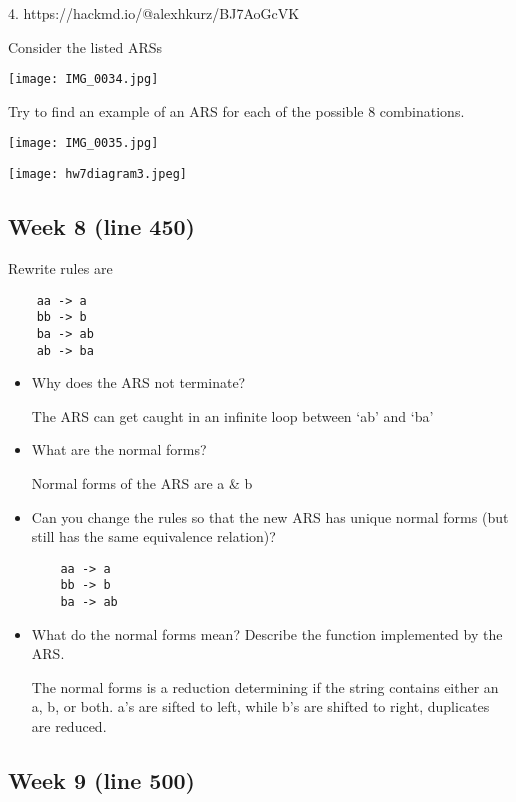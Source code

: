 \documentclass{article}
\theoremstyle{theorem}
\theoremstyle{definition}
\theoremstyle{remark}
\begin{document}
4.  https://hackmd.io/@alexhkurz/BJ7AoGcVK

Consider the listed ARSs

\texttt{[image: IMG\_0034.jpg]}

Try to find an example of an ARS for each of the possible 8 combinations.

\texttt{[image: IMG\_0035.jpg]}

\texttt{[image: hw7diagram3.jpeg]}

\subsection{Week 8 (line 450)}
Rewrite rules are
\begin{verbatim}
    aa -> a
    bb -> b
    ba -> ab
    ab -> ba
\end{verbatim}
\begin{itemize}
\item Why does the ARS not terminate?

The ARS can get caught in an infinite loop between ‘ab’ and ‘ba’

\item What are the normal forms?

Normal forms of the ARS are a & b

\item Can you change the rules so that the new ARS has unique normal forms (but still has the same equivalence relation)?
\begin{verbatim}
    aa -> a
    bb -> b
    ba -> ab
\end{verbatim}
\item What do the normal forms mean? Describe the function implemented by the ARS.

The normal forms is a reduction determining if the string contains either an a, b, or both.
a’s are sifted to left, while b’s are shifted to right, duplicates are reduced.
\end{itemize}

\subsection{Week 9 (line 500)}
\end{document}
